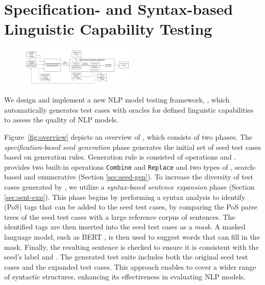 \section{Specification- and Syntax-based Linguistic Capability Testing}
\label{sec:approach}

\begin{figure}[thb]
  \centering
  \includegraphics[width=0.49\textwidth]{figs/overview.pdf}
  \vspace{-6mm}
  \caption{\OverviewFigCaption}
\end{figure}

  
  We design and implement a new NLP model testing framework, \tool, which automatically generates test cases with oracles for defined linguistic capabilities to assess the quality of NLP models.

Figure~\ref{fig:overview} depicts an overview of \tool, which
consists of two phases.  The \emph{specification-based seed generation} phase generates the initial set of seed test cases based on generation rules.
Generation rule is consisted of operations and \phs.
\tool provides two built-in operations \texttt{Combine} and \texttt{Replace} and two types of \phs, search-based and enumerative \phs (Section \ref{sec:seed-gen}). 
To increase the diversity of test cases generated by \tool, we utilize a \emph{syntax-based sentence expansion} phase (Section \ref{sec:sent-exp}). This phase begins by performing a syntax analysis to identify \pos (PoS) tags that can be added to the seed test cases, by comparing the PoS parse trees of the seed test cases with a large reference corpus of sentences. The identified tags are then inserted into the seed test cases as a \emph{mask}. A masked language model, such as BERT \cite{devlin2019bert}, is then used to suggest words that can fill in the mask. Finally, the resulting sentence is checked to ensure it is consistent with the seed's label and \lc. The generated test suite includes both the original seed test cases and the expanded test cases. This approach enables \tool to cover a wider range of syntactic structures, enhancing its effectiveness in evaluating NLP models.
\vspace{\AlgCompTableVSpace}


